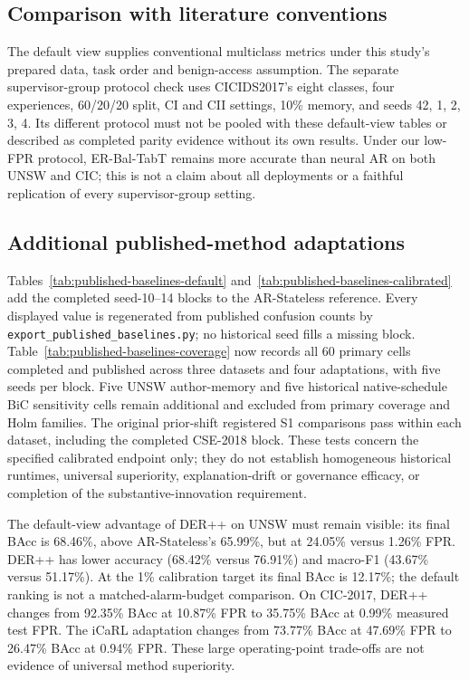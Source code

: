 \documentclass[10pt,twocolumn]{article}
\begin{document}
\subsection{Comparison with literature conventions}
The default view supplies conventional multiclass metrics under this study's prepared data, task order and benign-access assumption. The separate supervisor-group protocol check uses CICIDS2017's eight classes, four experiences, 60/20/20 split, CI and CII settings, 10\% memory, and seeds 42, 1, 2, 3, 4. Its different protocol must not be pooled with these default-view tables or described as completed parity evidence without its own results. Under our low-FPR protocol, ER-Bal-TabT remains more accurate than neural AR on both UNSW and CIC; this is not a claim about all deployments or a faithful replication of every supervisor-group setting.

\subsection{Additional published-method adaptations}
Tables~\ref{tab:published-baselines-default} and~\ref{tab:published-baselines-calibrated} add the completed seed-10--14 blocks to the AR-Stateless reference. Every displayed value is regenerated from published confusion counts by \texttt{export\_published\_baselines.py}; no historical seed fills a missing block. Table~\ref{tab:published-baselines-coverage} now records all 60 primary cells completed and published across three datasets and four adaptations, with five seeds per block. Five UNSW author-memory and five historical native-schedule BiC sensitivity cells remain additional and excluded from primary coverage and Holm families. The original prior-shift registered S1 comparisons pass within each dataset, including the completed CSE-2018 block. These tests concern the specified calibrated endpoint only; they do not establish homogeneous historical runtimes, universal superiority, explanation-drift or governance efficacy, or completion of the substantive-innovation requirement.

The default-view advantage of DER++ on UNSW must remain visible: its final BAcc is 68.46\%, above AR-Stateless's 65.99\%, but at 24.05\% versus 1.26\% FPR. DER++ has lower accuracy (68.42\% versus 76.91\%) and macro-F1 (43.67\% versus 51.17\%). At the 1\% calibration target its final BAcc is 12.17\%; the default ranking is not a matched-alarm-budget comparison. On CIC-2017, DER++ changes from 92.35\% BAcc at 10.87\% FPR to 35.75\% BAcc at 0.99\% measured test FPR. The iCaRL adaptation changes from 73.77\% BAcc at 47.69\% FPR to 26.47\% BAcc at 0.94\% FPR. These large operating-point trade-offs are not evidence of universal method superiority.
\end{document}
